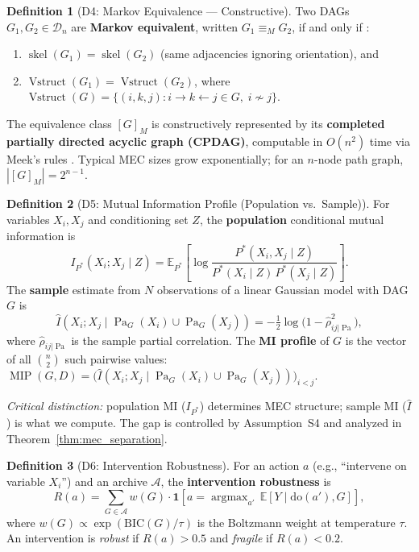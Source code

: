 \documentclass{article}
\theoremstyle{definition}
\newtheorem{definition}{Definition}
\theoremstyle{plain}
\theoremstyle{remark}
\DeclareMathOperator{\Pa}{Pa}
\DeclareMathOperator*{\argmax}{argmax}
\DeclareMathOperator{\MIP}{MIP}
\DeclareMathOperator{\skel}{skel}
\DeclareMathOperator{\Vstruct}{Vstruct}
\begin{document}
\begin{definition}[D4: Markov Equivalence --- Constructive]
\label{def:mec}
Two DAGs $G_1, G_2 \in \mathcal{D}_n$ are \textbf{Markov equivalent}, written
$G_1 \equiv_M G_2$, if and only if \citep{verma1990equivalence}:
\begin{enumerate}
  \item $\skel(G_1) = \skel(G_2)$ (same adjacencies ignoring orientation), and
  \item $\Vstruct(G_1) = \Vstruct(G_2)$, where
    $\Vstruct(G) = \{(i,k,j) : i \to k \leftarrow j \in G,\; i \not\sim j\}$.
\end{enumerate}
The equivalence class $[G]_M$ is constructively represented by its
\textbf{completed partially directed acyclic graph (CPDAG)}, computable in
$O(n^2)$ time via Meek's rules \citep{meek1995causal, chickering2002optimal}.
Typical MEC sizes grow exponentially; for an $n$-node path graph,
$|[G]_M| = 2^{n-1}$.
\end{definition}

\begin{definition}[D5: Mutual Information Profile (Population vs.\ Sample)]
\label{def:mi_profile}
For variables $X_i, X_j$ and conditioning set $Z$, the \textbf{population}
conditional mutual information is
$$I_{P^*}(X_i; X_j \mid Z) = \mathbb{E}_{P^*}\!\left[\log \frac{P^*(X_i, X_j \mid Z)}{P^*(X_i \mid Z)\,P^*(X_j \mid Z)}\right].$$
The \textbf{sample} estimate from $N$ observations of a linear Gaussian model
with DAG $G$ is
$$\widehat{I}(X_i; X_j \mid \Pa_G(X_i) \cup \Pa_G(X_j))
= -\tfrac{1}{2}\log\bigl(1 - \hat{\rho}_{ij|\Pa}^2\bigr),$$
where $\hat{\rho}_{ij|\Pa}$ is the sample partial correlation.
The \textbf{MI profile} of $G$ is the vector of all $\binom{n}{2}$ such pairwise
values:
$\MIP(G, D) = \bigl(\widehat{I}(X_i; X_j \mid \Pa_G(X_i) \cup \Pa_G(X_j))\bigr)_{i < j}$.

\emph{Critical distinction:} population MI ($I_{P^*}$) determines MEC
structure; sample MI ($\widehat{I}$) is what we compute. The gap is controlled
by Assumption~S4 and analyzed in Theorem~\ref{thm:mec_separation}.
\end{definition}

\begin{definition}[D6: Intervention Robustness]
\label{def:intervention_robustness}
For an action $a$ (e.g., ``intervene on variable $X_i$'') and an archive
$\mathcal{A}$, the \textbf{intervention robustness} is
$$R(a) = \sum_{G \in \mathcal{A}} w(G) \cdot \mathbf{1}\!\left[a = \argmax_{a'}\, \mathbb{E}[Y \mid \text{do}(a'), G]\right],$$
where $w(G) \propto \exp(\text{BIC}(G)/\tau)$ is the Boltzmann weight at
temperature $\tau$. An intervention is \emph{robust} if $R(a) > 0.5$ and
\emph{fragile} if $R(a) < 0.2$.
\end{definition}
\end{document}
